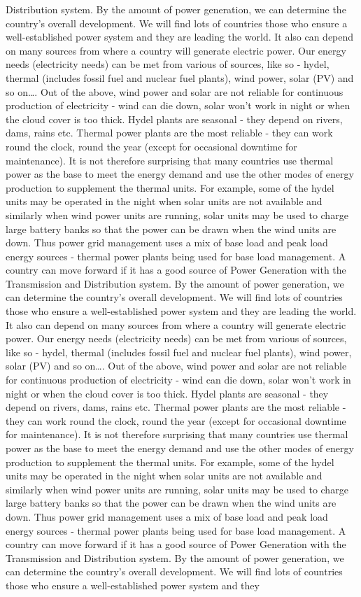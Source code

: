 \documentclass[10pt, a4paper]{article}
\begin{document}
Distribution system. By the amount of power generation, we can determine the country’s overall development. We will find lots of countries those who ensure a well-established power system and they are leading the world. It also can depend on many sources from where a country will generate electric power. Our energy needs (electricity needs) can be met from various of sources, like so - hydel, thermal (includes fossil fuel and nuclear fuel plants), wind power, solar (PV) and so on\dots. Out of the above, wind power and solar are not reliable for continuous production of electricity - wind can die down, solar won’t work in night or when the cloud cover is too thick. Hydel plants are seasonal - they depend on rivers, dams, rains etc. Thermal power plants are the most reliable - they can work round the clock, round the year (except for occasional downtime for maintenance). It is not therefore surprising that many countries use thermal power as the base to meet the energy demand and use the other modes of energy production to supplement the thermal units. For example, some of the hydel units may be operated in the night when solar units are not available and similarly when wind power units are running, solar units may be used to charge large battery banks so that the power can be drawn when the wind units are down. Thus power grid management uses a mix of base load and peak load energy sources - thermal power plants being used for base load management. A country can move forward if it has a good source of Power Generation with the Transmission and Distribution system. By the amount of power generation, we can determine the country’s overall development. We will find lots of countries those who ensure a well-established power system and they are leading the world. It also can depend on many sources from where a country will generate electric power. Our energy needs (electricity needs) can be met from various of sources, like so - hydel, thermal (includes fossil fuel and nuclear fuel plants), wind power, solar (PV) and so on\dots. Out of the above, wind power and solar are not reliable for continuous production of electricity - wind can die down, solar won’t work in night or when the cloud cover is too thick. Hydel plants are seasonal - they depend on rivers, dams, rains etc. Thermal power plants are the most reliable - they can work round the clock, round the year (except for occasional downtime for maintenance). It is not therefore surprising that many countries use thermal power as the base to meet the energy demand and use the other modes of energy production to supplement the thermal units. For example, some of the hydel units may be operated in the night when solar units are not available and similarly when wind power units are running, solar units may be used to charge large battery banks so that the power can be drawn when the wind units are down. Thus power grid management uses a mix of base load and peak load energy sources - thermal power plants being used for base load management. A country can move forward if it has a good source of Power Generation with the Transmission and Distribution system. By the amount of power generation, we can determine the country’s overall development. We will find lots of countries those who ensure a well-established power system and they 
\end{document}
